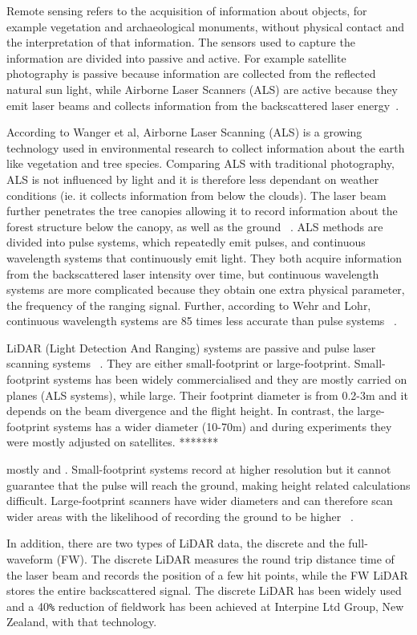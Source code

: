 \documentclass{subfiles}
\begin{document}
	\par Remote sensing refers to the acquisition of information about objects, {\color{blue} for example} vegetation and archaeological monuments, without physical contact and the interpretation of that information.  The sensors used to capture the information are divided into passive and active. For example satellite photography is passive because information are collected from the {\color{blue} reflected natural} sun light, while Airborne Laser Scanners (ALS) are active because they emit laser beams and collects information from the backscattered laser energy~\cite{Smith2012}.
	
	\par According to Wanger et al, Airborne Laser Scanning (ALS) is a growing technology used in environmental research to collect information about the earth like vegetation and tree species. Comparing ALS with traditional photography, {\color{blue} ALS is not influenced by light and it is therefore less dependant on weather conditions (ie. it collects information from below the clouds)}. The laser beam further penetrates the tree canopies {\color{blue} allowing it to record} information about the forest structure below the canopy, as well as the ground ~\cite{Wanger2004}. {\color{blue}ALS methods are divided into pulse systems, which repeatedly emit pulses, and continuous wavelength systems that continuously emit light. They both acquire information from the backscattered laser intensity over time, but continuous wavelength systems are more complicated because they obtain one extra physical parameter, the frequency of the ranging signal}. Further, according to Wehr and Lohr, continuous wavelength systems are 85 times less accurate than pulse systems ~\cite{Wehr1999}.
	
	\par {\color{blue} LiDAR (Light Detection And Ranging) systems are passive and pulse laser scanning systems ~\cite{Wehr1999}. They are either small-footprint or large-footprint. Small-footprint systems has been widely commercialised and they are mostly carried on planes (ALS systems), while large. Their footprint diameter  is from 0.2-3m and it depends on the beam divergence and the flight height.  In contrast, the large-footprint systems has a wider diameter (10-70m)  and during experiments they were mostly adjusted on satellites. *******
		
		 mostly  and . Small-footprint systems record at higher resolution but it cannot guarantee that the pulse will reach the ground, making height related calculations difficult. Large-footprint scanners have wider diameters and can therefore scan wider areas with the likelihood of recording the ground to be higher ~\cite{Mallet2009}. 
	
	\par In addition, there are two types of LiDAR data, the discrete and the full-waveform (FW). The discrete LiDAR measures the round trip distance time of the laser beam and records the position of a few hit points, while the FW LiDAR stores the entire backscattered signal. The discrete LiDAR has been widely used and a 40\verb|%| reduction of fieldwork has been achieved at Interpine Ltd Group, New Zealand, with that technology. }
	
\end{document}
